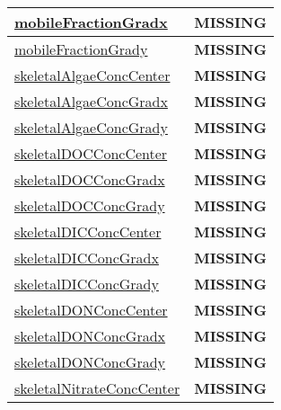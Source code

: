 {\begin{center}
\begin{longtable}{| p{2.0in} | p{4.0in} |}
    \hline
    \hyperref[subsec:var_sec_tracer_reconstruction_mobileFractionGradx]{mobileFractionGradx} & {\bf \color{red} MISSING} \\
    \hline
    \hyperref[subsec:var_sec_tracer_reconstruction_mobileFractionGrady]{mobileFractionGrady} & {\bf \color{red} MISSING} \\
    \hline
    \hyperref[subsec:var_sec_tracer_reconstruction_skeletalAlgaeConcCenter]{skeletalAlgaeConcCenter} & {\bf \color{red} MISSING} \\
    \hline
    \hyperref[subsec:var_sec_tracer_reconstruction_skeletalAlgaeConcGradx]{skeletalAlgaeConcGradx} & {\bf \color{red} MISSING} \\
    \hline
    \hyperref[subsec:var_sec_tracer_reconstruction_skeletalAlgaeConcGrady]{skeletalAlgaeConcGrady} & {\bf \color{red} MISSING} \\
    \hline
    \hyperref[subsec:var_sec_tracer_reconstruction_skeletalDOCConcCenter]{skeletalDOCConcCenter} & {\bf \color{red} MISSING} \\
    \hline
    \hyperref[subsec:var_sec_tracer_reconstruction_skeletalDOCConcGradx]{skeletalDOCConcGradx} & {\bf \color{red} MISSING} \\
    \hline
    \hyperref[subsec:var_sec_tracer_reconstruction_skeletalDOCConcGrady]{skeletalDOCConcGrady} & {\bf \color{red} MISSING} \\
    \hline
    \hyperref[subsec:var_sec_tracer_reconstruction_skeletalDICConcCenter]{skeletalDICConcCenter} & {\bf \color{red} MISSING} \\
    \hline
    \hyperref[subsec:var_sec_tracer_reconstruction_skeletalDICConcGradx]{skeletalDICConcGradx} & {\bf \color{red} MISSING} \\
    \hline
    \hyperref[subsec:var_sec_tracer_reconstruction_skeletalDICConcGrady]{skeletalDICConcGrady} & {\bf \color{red} MISSING} \\
    \hline
    \hyperref[subsec:var_sec_tracer_reconstruction_skeletalDONConcCenter]{skeletalDONConcCenter} & {\bf \color{red} MISSING} \\
    \hline
    \hyperref[subsec:var_sec_tracer_reconstruction_skeletalDONConcGradx]{skeletalDONConcGradx} & {\bf \color{red} MISSING} \\
    \hline
    \hyperref[subsec:var_sec_tracer_reconstruction_skeletalDONConcGrady]{skeletalDONConcGrady} & {\bf \color{red} MISSING} \\
    \hline
    \hyperref[subsec:var_sec_tracer_reconstruction_skeletalNitrateConcCenter]{skeletalNitrateConcCenter} & {\bf \color{red} MISSING} \\

\end{longtable}
\end{center}}
